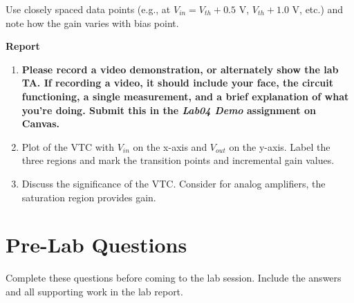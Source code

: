 \documentclass[10pt]{article}
\begin{document}
Use closely spaced data points (e.g., at $V_{in} = V_{th} + 0.5$ V, $V_{th} + 1.0$ V, etc.) and note how the gain varies with bias point.

\textbf{Report}
\begin{enumerate}
    \item \textbf{Please record a video demonstration, or alternately show the lab TA. If recording a video, it should include your face, the circuit functioning, a single measurement, and a brief explanation of what you're doing. Submit this in the \emph{Lab04 Demo} assignment on Canvas.}
    \item Plot of the VTC with $V_{in}$ on the x-axis and $V_{out}$ on the y-axis. Label the three regions and mark the transition points and incremental gain values.
    \item Discuss the significance of the VTC. Consider for analog amplifiers, the saturation region provides gain.
\end{enumerate}




\section{Pre-Lab Questions}
\label{sec:prelab}

Complete these questions before coming to the lab session.  Include the answers and all supporting work in the lab report.
\end{document}
